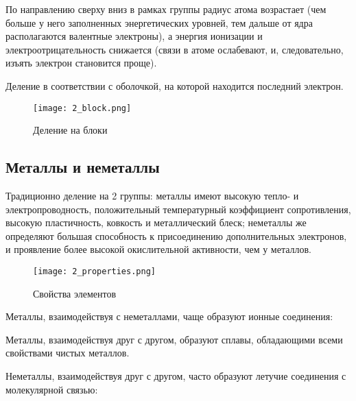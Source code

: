  По направлению сверху вниз в рамках группы радиус атома возрастает (чем больше у него заполненных энергетических уровней, тем дальше от ядра располагаются валентные электроны), а энергия ионизации и электроотрицательность снижается (связи в атоме ослабевают, и, следовательно, изъять электрон становится проще).
 
 
 Деление в соответствии с оболочкой, на которой находится последний электрон.
 
 \begin{figure}[H]
     \centering
     \texttt{[image: 2\_block.png]}
     \caption{Деление на блоки}
     \label{fig:2block}
 \end{figure}
 
 \subsection{Металлы и неметаллы}
 
Традиционно деление на 2 группы: металлы имеют высокую тепло- и электропроводность, положительный температурный коэффициент сопротивления, высокую пластичность, ковкость и металлический блеск; неметаллы же определяют большая способность к присоединению дополнительных электронов, и проявление более высокой окислительной активности, чем у металлов.

\begin{figure}[H]
    \centering
    \texttt{[image: 2\_properties.png]}
    \caption{Свойства элементов}
    \label{fig:2properties}
\end{figure}

Металлы, взаимодействуя с неметаллами, чаще образуют ионные соединения:


Металлы, взаимодействуя друг с другом, образуют сплавы, обладающими всеми свойствами чистых металлов.

Неметаллы, взаимодействуя друг с другом, часто образуют летучие соединения с молекулярной связью:


